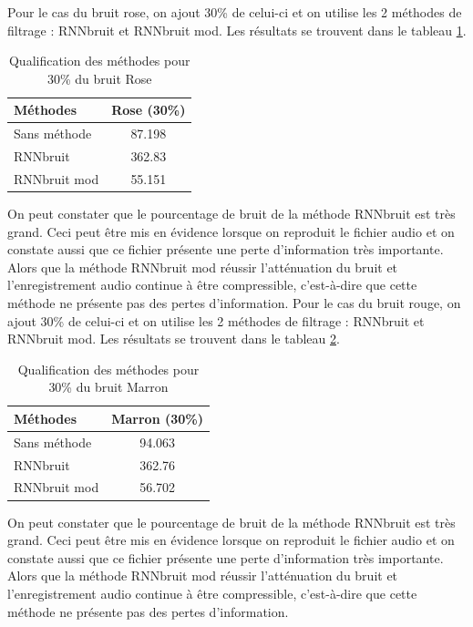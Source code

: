 \documentclass[conference,onecolumn]{IEEEtran}
\begin{document}
Pour le cas du bruit rose, on ajout 30\% de celui-ci et on utilise les 2 méthodes de filtrage : RNNbruit et RNNbruit mod. Les résultats se trouvent dans le tableau \ref{table:t11}.


\begin{table}[hbt!]
    \centering
    \begin{tabular}{ l  c }
    \textbf{Méthodes} & \textbf{Rose (30\%)} \\
    \hline
    Sans méthode &  87.198\\
    RNNbruit &  362.83\\
    RNNbruit mod &  55.151\\
    \end{tabular}
    \caption{Qualification des méthodes pour 30\% du bruit Rose}
    \label{table:t11}
\end{table}
On peut constater que le pourcentage de bruit de la méthode RNNbruit est très grand. Ceci peut être mis en évidence lorsque on reproduit le fichier audio et on constate aussi que ce fichier présente une perte d’information très importante. Alors que la méthode RNNbruit mod réussir l’atténuation du bruit et l’enregistrement audio continue à être compressible, c’est-à-dire que cette méthode ne présente pas des pertes d’information. 
Pour le cas du bruit rouge, on ajout 30\% de celui-ci et on utilise les 2 méthodes de filtrage : RNNbruit et RNNbruit mod. Les résultats se trouvent dans le tableau \ref{table:t12}.

\begin{table}[hbt!]
    \centering
    \begin{tabular}{ l  c }
    \textbf{Méthodes} & \textbf{Marron (30\%)} \\
    \hline
    Sans méthode &  94.063\\
    RNNbruit &  362.76\\
    RNNbruit mod &  56.702\\
    \end{tabular}
    \caption{Qualification des méthodes pour 30\% du bruit Marron}
    \label{table:t12}
\end{table}

On peut constater que le pourcentage de bruit de la méthode RNNbruit est très grand. Ceci peut être mis en  évidence lorsque on reproduit le fichier audio et on constate aussi que ce fichier présente une perte d’information très importante. Alors que la méthode RNNbruit mod réussir l’atténuation du bruit et l’enregistrement audio continue à être compressible, c’est-à-dire que cette méthode ne présente pas des pertes d’information.
\end{document}
